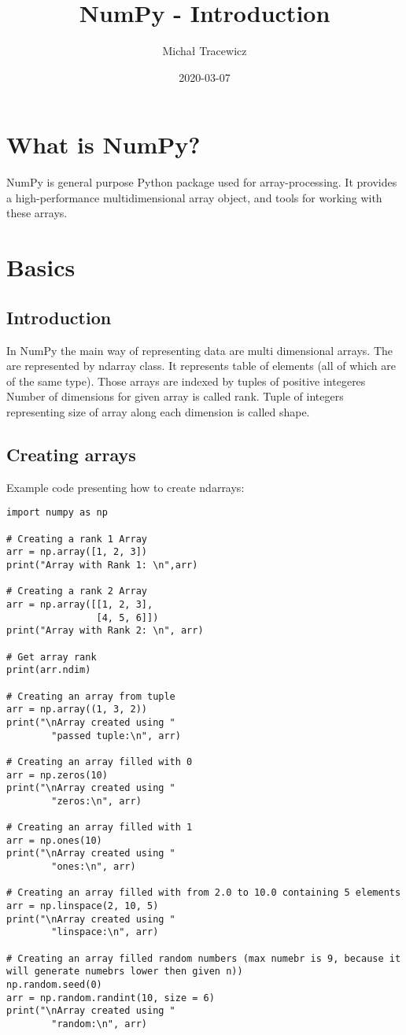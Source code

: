 \documentclass{article}
\title{NumPy - Introduction}
\author{Michał Tracewicz}
\date{2020-03-07}
\begin{document}
\maketitle
\newpage
{}
\section{What is NumPy?}
NumPy is general purpose Python package used for array-processing.
It provides a high-performance multidimensional array object, and tools for working with these arrays.
\section{Basics}
\subsection{Introduction}
In NumPy the main way of representing data are multi dimensional arrays.
The are represented by ndarray class. It represents table of elements (all of which are of the same type).
Those arrays are indexed by tuples of positive integeres
Number of dimensions for given array is called rank.
Tuple of integers representing size of array along each dimension is called shape.
\subsection{Creating arrays}
Example code presenting how to create ndarrays:
\begin{lstlisting}
import numpy as np

# Creating a rank 1 Array
arr = np.array([1, 2, 3])
print("Array with Rank 1: \n",arr)

# Creating a rank 2 Array
arr = np.array([[1, 2, 3],
                [4, 5, 6]])
print("Array with Rank 2: \n", arr)

# Get array rank
print(arr.ndim)

# Creating an array from tuple
arr = np.array((1, 3, 2))
print("\nArray created using "
        "passed tuple:\n", arr)

# Creating an array filled with 0
arr = np.zeros(10)
print("\nArray created using "
        "zeros:\n", arr)

# Creating an array filled with 1
arr = np.ones(10)
print("\nArray created using "
        "ones:\n", arr)

# Creating an array filled with from 2.0 to 10.0 containing 5 elements
arr = np.linspace(2, 10, 5)
print("\nArray created using "
        "linspace:\n", arr)

# Creating an array filled random numbers (max numebr is 9, because it will generate numebrs lower then given n))
np.random.seed(0)
arr = np.random.randint(10, size = 6)
print("\nArray created using "
        "random:\n", arr)
\end{lstlisting}
\end{document}
